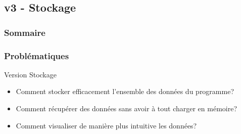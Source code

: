 \documentclass{beamer}
\begin{document}
        \subsection{v3 - Stockage}
            \begin{frame}
                \frametitle{Sommaire}
            \end{frame}
            \begin{frame}
            \frametitle{Problématiques}
            Version Stockage
            \pause
            \begin{itemize}
            \item Comment stocker efficacement l'ensemble des données du programme?
            \pause
            \item Comment récupérer des données sans avoir à tout charger en mémoire?
            \pause
            \item Comment visualiser de manière plus intuitive les données?
            \end{itemize}
            \end{frame}
\end{document}
